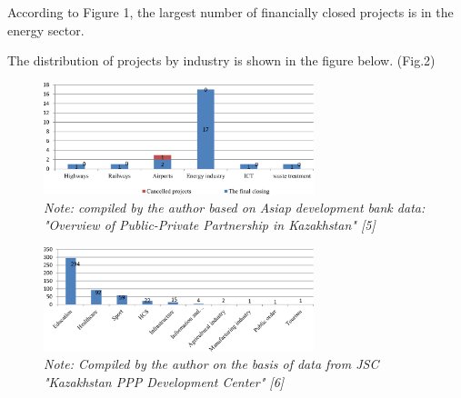 \begin{multicols}{2}
According to Figure 1, the largest number of financially closed projects
is in the energy sector.

The distribution of projects by industry is shown in the figure below.
(Fig.2)
\end{multicols}

\begin{figure}[H]
	\centering
	\includegraphics[width=0.7\textwidth]{media/ekon4/image17}
	\caption*{Fig.1 - PPP projects in Kazakhstan that reached financial closure and were cancelled in the period from independence to 2020}
	\caption*{\normalfont\emph{Note: compiled by the author based on Asiap development bank data:
"Overview of Public-Private Partnership in Kazakhstan" {[}5{]}}}
\end{figure}

\begin{figure}[H]
	\centering
	\includegraphics[width=0.7\textwidth]{media/ekon4/image18}
	\caption*{Fig.2 - Distribution of projects by industry}
	\caption*{\normalfont\emph{Note: Compiled by the author on the basis of data from JSC "Kazakhstan PPP Development Center" {[}6{]}}}
\end{figure}

